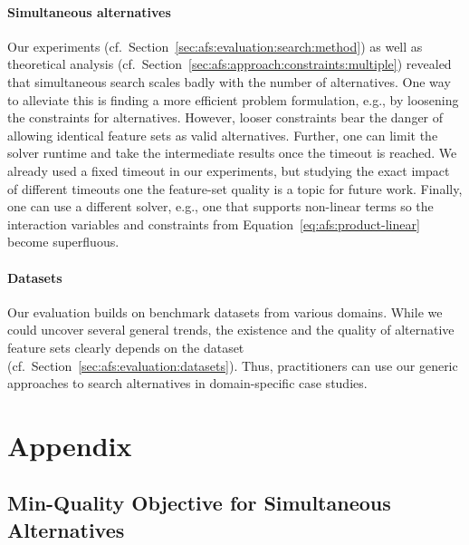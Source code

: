 \documentclass{article}
\theoremstyle{definition}
\begin{document}
\paragraph{Simultaneous alternatives}

Our experiments (cf.~Section~\ref{sec:afs:evaluation:search:method}) as well as theoretical analysis (cf.~Section~\ref{sec:afs:approach:constraints:multiple}) revealed that simultaneous search scales badly with the number of alternatives.
One way to alleviate this is finding a more efficient problem formulation, e.g., by loosening the constraints for alternatives.
However, looser constraints bear the danger of allowing identical feature sets as valid alternatives.
Further, one can limit the solver runtime and take the intermediate results once the timeout is reached.
We already used a fixed timeout in our experiments, but studying the exact impact of different timeouts one the feature-set quality is a topic for future work.
Finally, one can use a different solver, e.g., one that supports non-linear terms so the interaction variables and constraints from Equation~\ref{eq:afs:product-linear} become superfluous.

\paragraph{Datasets}

Our evaluation builds on benchmark datasets from various domains.
While we could uncover several general trends, the existence and the quality of alternative feature sets clearly depends on the dataset (cf.~Section~\ref{sec:afs:evaluation:datasets}).
Thus, practitioners can use our generic approaches to search alternatives in domain-specific case studies.

\appendix

\section{Appendix}
\label{sec:afs:appendix}

\subsection{Min-Quality Objective for Simultaneous Alternatives}
\label{sec:afs:appendix:min-quality-objective}
\end{document}
